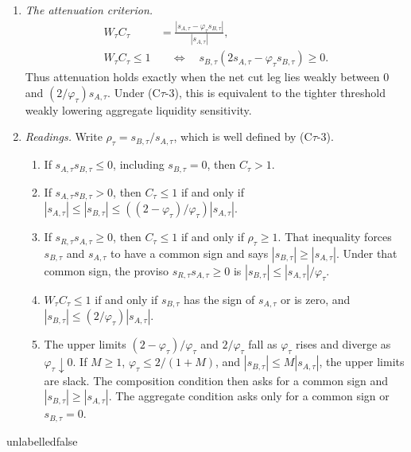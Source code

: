 \begin{corollary}
\begin{enumerate}[label=(\roman*),leftmargin=2.4em,itemsep=3pt]
\begin{equation}
\begin{aligned}
  \end{aligned}
  \end{equation}
  Thus $C_\tau\le1$ exactly when the net cut leg lies weakly between $s_{A,\tau}$ and
  $((2-\varphi_\tau)/\varphi_\tau)s_{A,\tau}$. Under (C$\tau$-4), this is equivalent to
  Condition~\ref{cond:D}.
\item \emph{The attenuation criterion.}
  \begin{equation}
  \label{eq:caught-tau-WC}
  \begin{aligned}
  W_\tau C_\tau
  &=\frac{|s_{A,\tau}-\varphi_\tau s_{B,\tau}|}{|s_{A,\tau}|},\\
  W_\tau C_\tau\le1
  &\quad\Longleftrightarrow\quad
  s_{B,\tau}(2s_{A,\tau}-\varphi_\tau s_{B,\tau})\ge0.
  \end{aligned}
  \end{equation}
  Thus attenuation holds exactly when the net cut leg lies weakly between $0$ and
  $(2/\varphi_\tau)s_{A,\tau}$. Under (C$\tau$-3), this is equivalent to the tighter threshold
  weakly lowering aggregate liquidity sensitivity.
\item \emph{Readings.} Write $\rho_\tau=s_{B,\tau}/s_{A,\tau}$, which is well defined by
  (C$\tau$-3).
  \begin{enumerate}[label=(\alph*),leftmargin=2.2em,itemsep=2pt]
  \item If $s_{A,\tau}s_{B,\tau}\le0$, including $s_{B,\tau}=0$, then $C_\tau>1$.
  \item If $s_{A,\tau}s_{B,\tau}>0$, then $C_\tau\le1$ if and only if
    $|s_{A,\tau}|\le|s_{B,\tau}|\le
    ((2-\varphi_\tau)/\varphi_\tau)|s_{A,\tau}|$.
  \item If $s_{R,\tau}s_{A,\tau}\ge0$, then $C_\tau\le1$ if and only if
    $\rho_\tau\ge1$. That inequality forces $s_{B,\tau}$ and $s_{A,\tau}$ to have a common sign and
    says $|s_{B,\tau}|\ge|s_{A,\tau}|$. Under that common sign, the proviso
    $s_{R,\tau}s_{A,\tau}\ge0$ is
    $|s_{B,\tau}|\le|s_{A,\tau}|/\varphi_\tau$.
  \item $W_\tau C_\tau\le1$ if and only if $s_{B,\tau}$ has the sign of
    $s_{A,\tau}$ or is zero, and
    $|s_{B,\tau}|\le(2/\varphi_\tau)|s_{A,\tau}|$.
  \item The upper limits $(2-\varphi_\tau)/\varphi_\tau$ and $2/\varphi_\tau$ fall as
    $\varphi_\tau$ rises and diverge as $\varphi_\tau\downarrow0$. If $M\ge1$,
    $\varphi_\tau\le2/(1+M)$, and $|s_{B,\tau}|\le M|s_{A,\tau}|$, the upper limits are slack.
    The composition condition then asks for a common sign and
    $|s_{B,\tau}|\ge|s_{A,\tau}|$. The aggregate condition asks only for a common sign or
    $s_{B,\tau}=0$.
  \end{enumerate}
\end{enumerate}
\end{corollary}
\csname unlabelledfalse\endcsname

